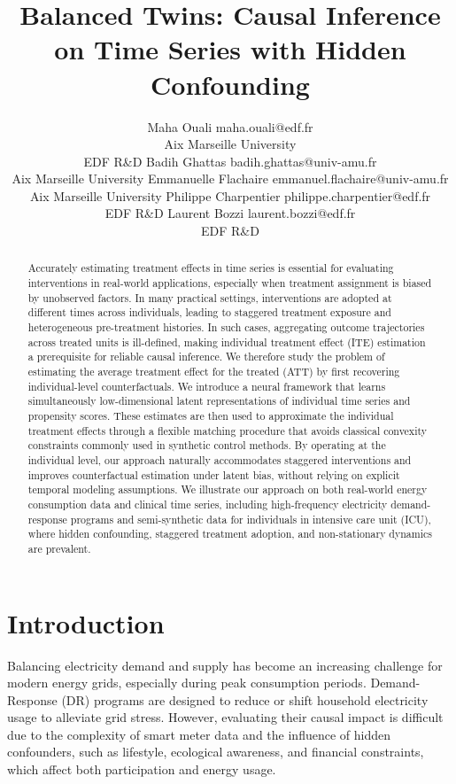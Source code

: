 \documentclass[10pt]{article} %
\title{Balanced Twins: Causal Inference on Time Series with Hidden Confounding
}
\author{\name Maha Ouali \email maha.ouali@edf.fr \\
      \addr Aix Marseille University\\
      EDF R\&D
      \AND
      \name Badih Ghattas \email badih.ghattas@univ-amu.fr \\
      \addr Aix Marseille University
      \AND
      \name Emmanuelle Flachaire \email emmanuel.flachaire@univ-amu.fr\\
      \addr  Aix Marseille University
      \AND
      \name Philippe Charpentier \email philippe.charpentier@edf.fr\\
      \addr  EDF R\&D \AND
      \name  Laurent Bozzi \email laurent.bozzi@edf.fr\\
      \addr  EDF R\&D}
\begin{document}
\maketitle

\begin{abstract}
Accurately estimating treatment effects in time series is essential for evaluating interventions in real-world applications, especially when treatment assignment is biased by unobserved factors. In many practical settings, interventions are adopted at different times across individuals, leading to staggered treatment exposure and heterogeneous pre-treatment histories. In such cases, aggregating outcome trajectories across treated units is ill-defined, making individual treatment effect (ITE) estimation a prerequisite for reliable causal inference. We therefore study the problem of estimating the average treatment effect for the treated (ATT) by first recovering individual-level counterfactuals.
We introduce a neural framework that learns simultaneously low-dimensional latent representations of individual time series and propensity scores. These estimates are then used to approximate the individual treatment effects through a flexible matching procedure that avoids classical convexity constraints commonly used in synthetic control methods. By operating at the individual level, our approach naturally accommodates staggered interventions and improves counterfactual estimation under latent bias, without relying on explicit temporal modeling assumptions.
We illustrate our approach on both real-world energy consumption data and clinical time series, including high-frequency electricity demand-response programs and semi-synthetic data for individuals in intensive care unit (ICU), where hidden confounding, staggered treatment adoption, and non-stationary dynamics are prevalent.
\end{abstract}

\section{Introduction}
Balancing electricity demand and supply has become an increasing challenge for modern energy grids, especially during peak consumption periods. Demand-Response (DR) programs are designed to reduce or shift household electricity usage to alleviate grid stress. However, evaluating their causal impact is difficult due to the complexity of smart meter data and the influence of hidden confounders, such as lifestyle, ecological awareness, and financial constraints, which affect both participation and energy usage.
\end{document}
